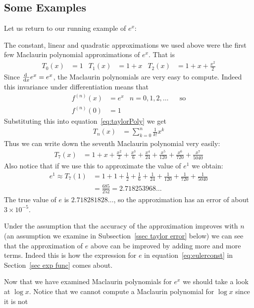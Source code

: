 \subsection{Some Examples}
Let us return to our running example of $e^x$:
\begin{eg}\label{eg taylor e to the x}
 The constant, linear and quadratic approximations we used above were the first few
Maclaurin polynomial approximations of $e^x$. That is
\begin{align*}
  T_0 (x) & = 1 & T_1(x) &= 1+x & T_2(x) &= 1+x+\frac{x^2}{2}
\end{align*}
Since $\diff{}{x} e^x = e^x$, the Maclaurin polynomials are very easy to compute.
Indeed this invariance under differentiation means that
\begin{align*}
  f^{(n)}(x) &= e^x & n=0,1,2,\dots && \text{so}\\
  f^{(n)}(0) &= 1
\end{align*}
Substituting this into equation~\eqref{eq:taylorPoly} we get
\begin{align*}
  T_n(x) &= \sum_{k=0}^n \frac{1}{k!} x^k
\end{align*}
Thus we can write down the seventh Maclaurin polynomial very easily:
\begin{align*}
  T_7(x) &= 1 + x + \frac{x^2}{2} + \frac{x^3}{6} + \frac{x^4}{24} + \frac{x^5}{120} +
\frac{x^6}{720} + \frac{x^7}{5040}
\end{align*}
Also notice that if we use this to approximate the value of $e^1$ we obtain:
\begin{align*}
  e^1 \approx T_7(1) &= 1 + 1 + \frac{1}{2} + \frac{1}{6} + \frac{1}{24} + \frac{1}{120}
+ \frac{1}{720} + \frac{1}{5040} \\
  &= \frac{685}{252} =  2.718253968\dots
\end{align*}
The true value of $e$ is $2.718281828\dots$, so the approximation has an error of about
$3\times10^{-5}$.

Under the assumption that the accuracy of the approximation improves with
$n$ (an assumption we examine in Subsection~\ref{ssec taylor error} below) we can see
that the approximation of $e$ above can be improved by adding more and more terms. Indeed
this is how the expression for $e$ in equation~\eqref{eq:eulerconst} in
Section~\ref{sec exp func} comes about.
\end{eg}
Now that we have examined Maclaurin polynomials for $e^x$ we should take a look at $\log
x$. Notice that we cannot compute a Maclaurin polynomial for $\log x$ since it is not
